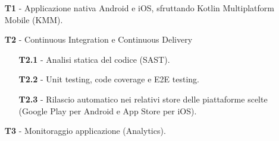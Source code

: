 \begin{itemize}
    \item[\textbf{T1}] - Applicazione nativa Android e iOS, sfruttando Kotlin Multiplatform Mobile (KMM).
    \item[\textbf{T2}] - Continuous Integration e Continuous Delivery
    \begin{itemize}
        \item[\textbf{T2.1}] - Analisi statica del codice (SAST).
        \item[\textbf{T2.2}] - Unit testing, code coverage e E2E testing.
        \item[\textbf{T2.3}] - Rilascio automatico nei relativi store delle piattaforme scelte (Google Play per Android e App Store per iOS).
    \end{itemize}
    \item[\textbf{T3}] - Monitoraggio applicazione (Analytics).
\end{itemize}
